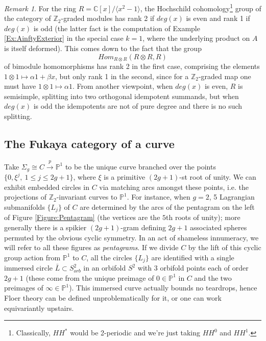 \documentclass[reqno,10pt]{amsart}
\numberwithin{equation}{section}
\newcommand{\bC}{{\mathbb C}}
\newcommand{\bP}{{\mathbb P}}
\newcommand{\bZ}{{\mathbb Z}}
\theoremstyle{remark}
\newtheorem{Remark}[thm]{Remark}
\begin{document}
\begin{Remark} \label{Rem:HH}
For the ring $R=\bC[x]/ \langle x^2-1 \rangle$, the Hochschild cohomology\footnote{Classically, $HH^*$ would be 2-periodic and we're just taking $HH^0$ and $HH^1$.} group of the category of $\bZ_2$-graded modules has rank 2 if $deg(x)$ is even and rank 1 if $deg(x)$ is odd (the latter fact is the computation of Example \ref{Ex:AinftyExterior} in the special case $k=1$, where the underlying product on $A$ is itself deformed).  This comes down to the fact that the group
\[
Hom_{R\otimes R}(R\otimes R, R)
\]
of bimodule homomorphisms has rank 2 in the first case, comprising the elements $1\otimes 1 \mapsto \alpha 1 + \beta x$, but only rank 1 in the second, since for a $\bZ_2$-graded map one must have $1\otimes 1 \mapsto \alpha 1$.  From another viewpoint, when $deg(x)$ is even, $R$ is semisimple, splitting into two orthogonal idempotent summands, but when $deg(x)$ is odd the idempotents are not of pure degree and there is no such splitting.
\end{Remark}

\subsection{The Fukaya category of a curve\label{Section:Curve}}

Take $\Sigma_g\cong C \stackrel{p}{\rightarrow} \bP^1$ to be the unique curve branched over the points $\{0, \xi^j, \ 1\leq j\leq 2g+1\}$, where $\xi$ is a primitive $(2g+1)$-st root of unity.  We can exhibit embedded circles in $C$ via matching arcs amongst these points, i.e. the projections of $\bZ_2$-invariant curves to $\bP^1$. For instance, when $g=2$,  5 Lagrangian submanifolds $\{L_j\}$ of $C$ are determined by the arcs of the pentagram on the left of Figure \ref{Figure:Pentagram} (the vertices are the $5$th roots of unity); more generally there is a spikier $(2g+1)$-gram defining $2g+1$ associated spheres permuted by the obvious cyclic symmetry.  In an act of shameless innumeracy, we will refer to all these figures as \emph{pentagrams}.  If we divide $C$ by the lift of this cyclic group action from $\bP^1$ to $C$,  all the circles $\{L_j\}$ are identified with a single immersed circle $\bar{L} \subset S^2_{orb}$ in an orbifold $S^2$ with 3 orbifold points each of order $2g+1$ (these come from the unique preimage of $0\in\bP^1$ in $C$ and the two preimages of $\infty \in \bP^1$).  This immersed curve actually bounds no teardrops, hence Floer theory can be defined unproblematically for it, or one can work equivariantly upstairs.
\end{document}
